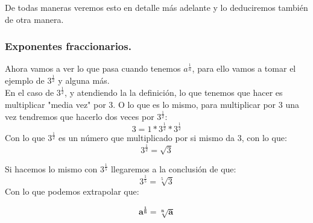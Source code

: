 \documentclass[a4paper,11pt,answers]{exam}
\begin{document}
De todas maneras veremos esto en detalle más adelante y lo deduciremos también de otra manera.

\subsubsection{Exponentes fraccionarios.}
Ahora vamos a ver lo que pasa cuando tenemos $a^\frac{1}{n}$, para ello vamos a tomar el ejemplo de $3^\frac{1}{2}$ y alguna más.\\

En el caso de $3^\frac{1}{2}$, y atendiendo la la definición, lo que tenemos que hacer es multiplicar "media vez" por 3. O lo que es lo mismo, para multiplicar por 3 una vez tendremos que hacerlo dos veces por $3^\frac{1}{2}$:
\[3 = 1*3^\frac{1}{2}*3^\frac{1}{2}\]
Con lo que $3^\frac{1}{2}$ es un número que multiplicado por si mismo da 3, con lo que:
\[3^\frac{1}{2} = \sqrt{3}\]

Si hacemos lo mismo con $3^\frac{1}{5}$ llegaremos a la conclusión de que:
\[3^\frac{1}{5} = \sqrt[5]{3}\]
Con lo que podemos extrapolar que:
\begin{Large}
\[\boldsymbol{a^\frac{1}{n} = \sqrt[n]{a}}\]
\end{Large}
\end{document}
